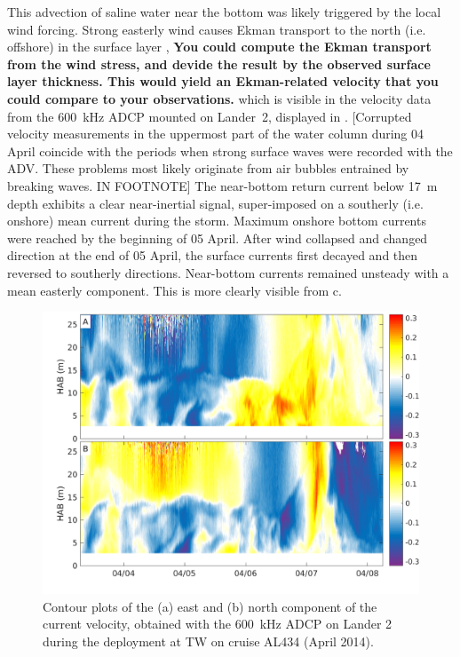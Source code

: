  This advection of saline water near the bottom was likely triggered by the 
local wind 
forcing. Strong easterly wind causes Ekman transport to the north (i.e. 
offshore) in the surface layer \citep[][]{lass2001}, \textbf{You could compute 
the Ekman transport from the wind stress, and devide the result by the observed 
surface layer thickness. This would yield an Ekman-related velocity that you 
could compare to your observations.} which is visible in the 
velocity data from the 600~kHz ADCP mounted on Lander~2, displayed in 
. [Corrupted velocity measurements in the uppermost part of the 
water column during 04 April coincide with the periods when strong surface 
waves were recorded with the ADV. These problems most likely originate from 
air bubbles entrained by breaking waves. IN FOOTNOTE] The near-bottom return 
current below 
17~m depth exhibits a clear near-inertial signal, super-imposed on a southerly 
(i.e. onshore) mean current during the storm. Maximum onshore bottom currents 
were reached by the beginning of 05 April. After wind collapsed and changed 
direction at the end of 05 April, the surface currents 
first decayed and then reversed to southerly directions. Near-bottom 
currents remained unsteady with a mean easterly component. This is more clearly 
visible from c.

 \begin{figure}[ht]
\includegraphics[width=40pc]{bilder/adcp600.png}
 \caption{Contour plots of the (a) east and (b) north component of the 
current velocity, obtained with the 600~kHz ADCP on 
Lander 2 during the deployment at TW on cruise AL434 (April 2014).}
 \label{adcp600}
 \end{figure}

